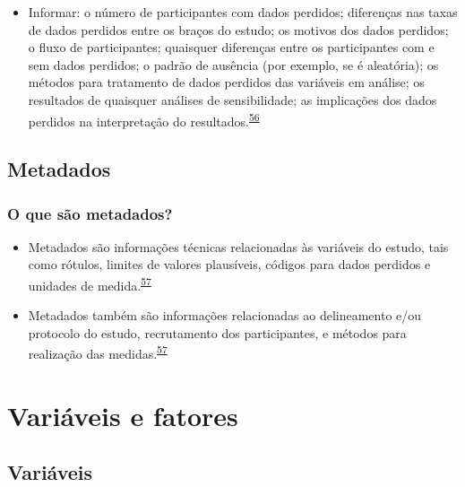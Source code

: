 \documentclass[
  a4paper,
]{book}
\providecommand{\tightlist}{%
  \setlength{\itemsep}{0pt}\setlength{\parskip}{0pt}}
\begin{document}
\begin{itemize}
\tightlist
\item
  Informar: o número de participantes com dados perdidos; diferenças nas taxas de dados perdidos entre os braços do estudo; os motivos dos dados perdidos; o fluxo de participantes; quaisquer diferenças entre os participantes com e sem dados perdidos; o padrão de ausência (por exemplo, se é aleatória); os métodos para tratamento de dados perdidos das variáveis em análise; os resultados de quaisquer análises de sensibilidade; as implicações dos dados perdidos na interpretação do resultados.\textsuperscript{\protect\hyperlink{ref-Akl2015}{56}}
\end{itemize}

\hypertarget{metadados}{%
\section{Metadados}\label{metadados}}

\hypertarget{o-que-suxe3o-metadados}{%
\subsection{O que são metadados?}\label{o-que-suxe3o-metadados}}

\begin{itemize}
\item
  Metadados são informações técnicas relacionadas às variáveis do estudo, tais como rótulos, limites de valores plausíveis, códigos para dados perdidos e unidades de medida.\textsuperscript{\protect\hyperlink{ref-Baillie2022}{57}}
\item
  Metadados também são informações relacionadas ao delineamento e/ou protocolo do estudo, recrutamento dos participantes, e métodos para realização das medidas.\textsuperscript{\protect\hyperlink{ref-Baillie2022}{57}}
\end{itemize}

\hypertarget{variaveis-fatores}{%
\chapter{\texorpdfstring{\textbf{Variáveis e fatores}}{Variáveis e fatores}}\label{variaveis-fatores}}

\hypertarget{variaveis}{%
\section{Variáveis}\label{variaveis}}
\end{document}

